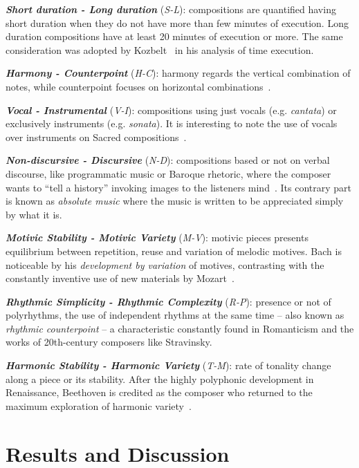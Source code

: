 \documentclass[
 aip,
 jmp,
 amsmath,amssymb,
 reprint,
]{revtex4-1}
\begin{document}
{\bf \em{ Short duration - Long duration}} (\emph{S-L}): compositions are
quantified having short duration when they do not have more than few minutes
of execution. Long duration compositions have at least 20 minutes of execution or
more. The same consideration was adopted by Kozbelt~\cite{Kozbelt01012009,
  Kozbelt01012007} in his analysis of time execution.

{\bf \em{ Harmony - Counterpoint}} (\emph{H-C}): harmony regards the
vertical combination of notes, while counterpoint focuses on
horizontal combinations~\cite{BennettHistory}.

{\bf \em{ Vocal - Instrumental}} (\emph{V-I}): compositions using just vocals
(e.g. \emph{cantata}) or exclusively instruments
(e.g. \emph{sonata}). It is interesting to note the use of
vocals over instruments on Sacred compositions~\cite{Lovelock}.

{\bf \em{ Non-discursive - Discursive}} (\emph{N-D}): compositions
based or not
on verbal discourse, like programmatic music or Baroque rhetoric, where the composer wants
to ``tell a history'' invoking images to the listeners
mind~\cite{BennettHistory}. Its contrary part is known as
\textit{absolute music} where the music is written to be appreciated simply
by what it is.

{\bf \em{ Motivic Stability - Motivic Variety}} (\emph{M-V}): motivic pieces presents equilibrium
between repetition, reuse and variation of melodic motives. Bach is noticeable by his
\textit{development by variation} of motives, contrasting with the
constantly inventive use of new materials by Mozart~\cite{Webern}.

{\bf \em{ Rhythmic Simplicity - Rhythmic Complexity}} (\emph{R-P}): presence or not of polyrhythms, the
use of independent rhythms at the same time -- also known as
\textit{rhythmic counterpoint}\cite{BennettHistory} -- a characteristic
constantly found in Romanticism and the works of 20th-century composers like Stravinsky.

{\bf \em{ Harmonic Stability - Harmonic Variety}} (\emph{T-M}):
rate of tonality change along a piece or its stability. After the highly
polyphonic development in Renaissance, Beethoven is credited as the
composer who returned to the maximum exploration of harmonic variety~\cite{Webern}.

\section{Results and Discussion}
\label{sec:results}
\end{document}
